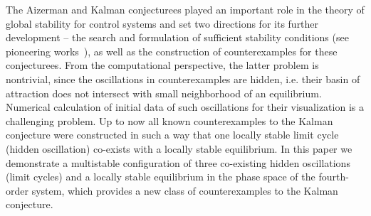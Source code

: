 \documentclass{ifacconf}
\theoremstyle{plain}
\begin{document}
The Aizerman and Kalman conjecturees played an important role in
the theory of global stability for control systems
and set two directions for its further development --
the search and formulation of sufficient stability conditions
(see pioneering works~\citep{Popov-1961,Kal63,GeligLY-1978}),
as well as the construction of counterexamples for these conjecturees.
From the computational perspective, the latter problem is nontrivial,
since the oscillations in counterexamples are hidden,
i.e. their basin of attraction does not intersect with small neighborhood of an equilibrium.
Numerical calculation of initial data of such oscillations for their visualization
is a challenging problem.
Up to now all known counterexamples to the Kalman conjecture were constructed in such a way
that one locally stable limit cycle (hidden oscillation) co-exists with a locally stable equilibrium.
In this paper we demonstrate a multistable configuration of three co-existing hidden oscillations (limit cycles)
and a locally stable equilibrium
in the phase space of the fourth-order system, which provides a new class of counterexamples
to the Kalman conjecture.
\end{document}
